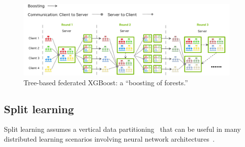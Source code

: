 \documentclass[11pt]{article}
\begin{document}
\begin{figure}[htbp]
    \centering
    \includegraphics[width=0.99\textwidth]{submissions/HolgerRoth/fig/TreeXGBoost.pdf}
    \caption{Tree-based federated XGBoost: a ``boosting of forests.'' \label{fig:tree_xgboost}}
\end{figure}


\subsection{Split learning}
Split learning assumes a vertical data partitioning~\cite{Holger-yang2019federated} that can be useful in many distributed learning scenarios involving neural network architectures~\cite{Holger-gupta2018distributed}.
\end{document}
